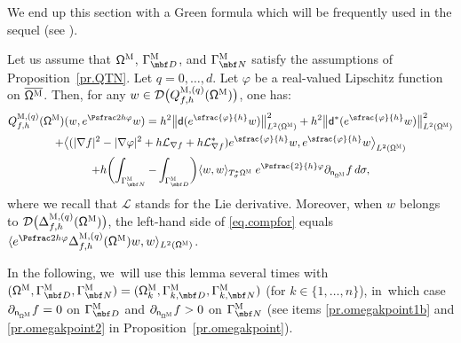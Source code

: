 We end up this section with a Green formula which will be frequently
used in the sequel (see \cite[Lem.\,2.10]{peutrec2020bar}).
\begin{lemma}
\label{le.GreenWeak}
Let us assume that $\mathsf \Omega^{\textsc{M}}$, $\Gamma^{\textsc{M}}_{\mbf D}$, and $\Gamma^{\textsc{M}}_{\mbf N}$ satisfy the assumptions of Proposition~\ref{pr.QTN}. Let $q=0,\ldots,d$.
Let $\varphi$ be a real-valued Lipschitz
function on $\overline{\mathsf \Omega^{\textsc{M}}}$. Then, for any
$w\in \mathcal D\bigl(Q^{\textsc{M},(q)}_{f,h} (\mathsf
\Omega^{\textsc{M}})\bigr)$, one has:\vspace*{-4pt}\enlargethispage{.5\baselineskip}
\begin{multline}
\label{eq.compfor}
{Q}^{\textsc{M},(q)}_{f,h} (\mathsf \Omega^{\textsc{M}})(w,e^{\Psfrac 2h \varphi} w)=
h^{2}\big \| \mathsf d (e^{\sfrac{\varphi}{h}} w)\big \|^{2}_{ L^{2} (\mathsf \Omega^{\textsc{M}})}+
h^{2} \big \| \mathsf d^{*} (e^{\sfrac{\varphi}{h}} w) \big \|^{2}_{ L^{2} (\mathsf \Omega^{\textsc{M}})}\\
+ \big \langle
(|\nabla f|^{2}-|\nabla \varphi|^{2}+h\mathcal{L}_{\nabla
f}+h\mathcal{L}_{\nabla
f}^{*})e^{\sfrac{\varphi}{h}} w, e^{\sfrac{\varphi}{h}}
w\big \rangle_{ L^{2} (\mathsf \Omega^{\textsc{M}})}\\
+h \biggl(\int_{\Gamma^{\textsc{M}}_{\mbf N}} - \int_{\Gamma^{\textsc{M}}_{\mbf D}}\biggr)
\langle w,w
\rangle_{ T_{\sigma}^{*}\mathsf \Omega^{\textsc{M}}}\;e^{\Psfrac{2 }{h}\varphi }\partial_{\mathsf n_{ \mathsf \Omega^{\textsc{M}} } }
f\, d\sigma,
\end{multline}
where we recall that $\mathcal{L}$ stands for the Lie derivative.
Moreover, when $w$ belongs to $\mathcal D\bigl(\Delta_{f,h}^{\textsc{M},(q)} (\mathsf \Omega^{\textsc{M}})\bigr)$, the left-hand
side of \eqref{eq.compfor} equals $\langle
e^{\Psfrac 2h \varphi}\Delta_{f,h}^{\textsc{M},(q)} (\mathsf \Omega^{\textsc{M}}) w,w\rangle_{L^{2} (\mathsf \Omega^{\textsc{M}})}$.
\end{lemma}
In the following, we~will use this lemma several times with $(\mathsf
\Omega^{\textsc{M}}, \Gamma^{\textsc{M}}_{\mbf D},
\Gamma^{\textsc{M}}_{\mbf N}) = (\mathsf \Omega_k^{\textsc{M}},
\Gamma_{k,\mbf D}^{\textsc{M}}, \Gamma_{k,\mbf N}^{\textsc{M}})$ (for
$k \in \{1, \ldots,n\}$), in~which case $\partial_{\mathsf n_{ \mathsf \Omega^{\textsc{M}}}}f=0$ on
$\Gamma^{\textsc{M}}_{\mbf D}$ and $\partial_{\mathsf n_{ \mathsf \Omega^{\textsc{M}}}}f>0$ on
$\Gamma^{\textsc{M}}_{\mbf N}$ (see items \eqref{pr.omegakpoint1b} and \eqref{pr.omegakpoint2} in Proposition~\ref{pr.omegakpoint}).

